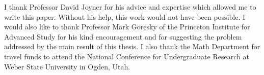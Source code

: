 \vskip 0.2in
 I thank Professor David Joyner for his
advice and expertise which allowed me to write this paper. Without his help,
this work would not have been possible. I would also like to thank
Professor Mark Goresky of the Princeton Institute for Advanced Study for
his kind encouragement and for suggesting the problem addressed by the
main result of this thesis. I also thank the Math Department for travel
funds to attend the National Conference for Undergraduate Research at
Weber State University in Ogden, Utah.
